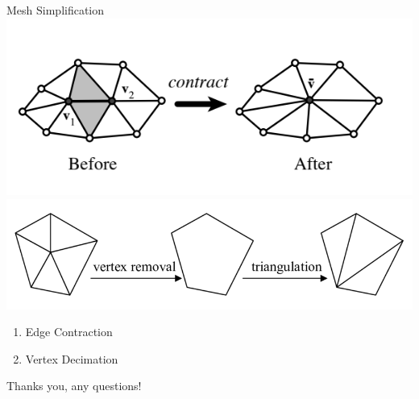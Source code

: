 \begin{frame}{Mesh Simplification}
    \includegraphics[scale=0.6]{images/edge-contract.png}
    \includegraphics[scale=0.3]{images/vertex-dec.png}
    \begin{enumerate}
        \item Edge Contraction
        \item Vertex Decimation
    \end{enumerate}
    
\end{frame}

\begin{frame}
    \centering
    Thanks you, any questions!
\end{frame}
